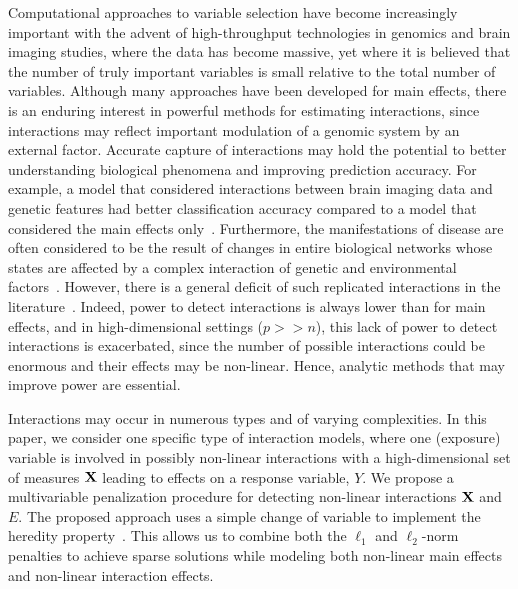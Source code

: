 Computational approaches to variable selection have become increasingly important with the advent of high-throughput technologies in genomics and brain imaging studies, where the data has become massive, yet where it is believed that the number of truly important variables is small relative to the total number of variables. 
Although many approaches have been developed for main effects, there is an enduring interest in powerful methods for estimating interactions, since interactions may reflect important modulation of a genomic system by an external factor. 
Accurate capture of interactions may hold the potential to better understanding  biological phenomena and improving prediction accuracy. 
For example, a model that considered interactions between brain imaging data and genetic features had better classification accuracy compared to a model that considered the main effects only~\citep{ning2018classifying}. 
Furthermore, the manifestations of disease are often considered to be the result of changes in entire biological networks whose states are affected by a complex interaction of genetic and environmental factors~\citep{schadt2009molecular}. 
However, there is a general deficit of such replicated interactions in the literature~\citep{timpson2018genetic}.   
Indeed, power to detect interactions is always lower than for  main effects, and in high-dimensional settings ($p >> n$), this lack of power to detect interactions is exacerbated, since the number of possible interactions could be enormous and their effects may be non-linear. Hence, analytic methods that may improve power are essential.  

Interactions may occur in numerous types and of varying complexities. In this paper, we consider one specific type of interaction models, where one (exposure) variable is involved in possibly non-linear interactions with a high-dimensional set of measures $\mathbf{X}$ leading to effects on a response variable, $Y$. We propose a multivariable penalization procedure for detecting non-linear interactions $\mathbf{X}$ and $E$. The proposed approach uses a simple change of variable to implement the heredity property~\citep{chipman1996bayesian}. This allows us to combine both the $\ell_1$ and $\ell_2$-norm penalties to achieve sparse solutions while modeling both non-linear main effects and non-linear interaction effects.  



